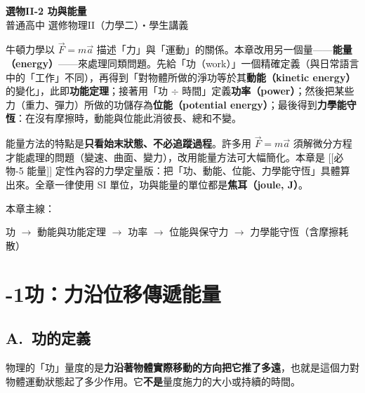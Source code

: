 \documentclass[11pt]{article}
\begin{document}
\begin{center}
{\sffamily\Huge\bfseries 選物II-2 功與能量}\\[3pt]
{\sffamily\large 普通高中 選修物理II（力學二）・學生講義}
\end{center}
\vspace{0.6em}

牛頓力學以 $\vec F=m\vec a$ 描述「力」與「運動」的關係。本章改用另一個量——\textbf{能量（energy）}——來處理同類問題。先給「功（work）」一個精確定義（與日常語言中的「工作」不同），再得到「對物體所做的淨功等於其\textbf{動能（kinetic energy）}的變化」，此即\textbf{功能定理}；接著用「功 $\div$ 時間」定義\textbf{功率（power）}；然後把某些力（重力、彈力）所做的功儲存為\textbf{位能（potential energy）}；最後得到\textbf{力學能守恆}：在沒有摩擦時，動能與位能此消彼長、總和不變。

能量方法的特點是\textbf{只看始末狀態、不必追蹤過程}。許多用 $\vec F=m\vec a$ 須解微分方程才能處理的問題（變速、曲面、變力），改用能量方法可大幅簡化。本章是 [[必物-5 能量]] 定性內容的力學定量版：把「功、動能、位能、力學能守恆」具體算出來。全章一律使用 SI 單位，功與能量的單位都是\textbf{焦耳（joule, J）}。

\medskip
本章主線：

\begin{center}
功 $\rightarrow$ 動能與功能定理 $\rightarrow$ 功率 $\rightarrow$ 位能與保守力 $\rightarrow$ 力學能守恆（含摩擦耗散）
\end{center}

\section*{-1\quad 功：力沿位移傳遞能量}

\subsection*{\sffamily A.\ 功的定義}

物理的「功」量度的是\textbf{力沿著物體實際移動的方向把它推了多遠}，也就是這個力對物體運動狀態起了多少作用。它\textbf{不是}量度施力的大小或持續的時間。
\end{document}
